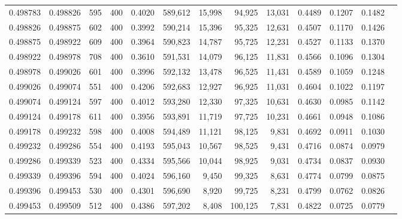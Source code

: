 \begin{tabular}{rrrrrrrrrrrrr}
0.498783 & 0.498826 &    595 & 400 &                                     0.4020 & 589,612 &  15,998 &  94,925 &  13,031 & 0.4489 & 0.1207 & 0.1482 \\
0.498826 & 0.498875 &    602 & 400 &                                     0.3992 & 590,214 &  15,396 &  95,325 &  12,631 & 0.4507 & 0.1170 & 0.1426 \\
0.498875 & 0.498922 &    609 & 400 &                                     0.3964 & 590,823 &  14,787 &  95,725 &  12,231 & 0.4527 & 0.1133 & 0.1370 \\
0.498922 & 0.498978 &    708 & 400 &                                     0.3610 & 591,531 &  14,079 &  96,125 &  11,831 & 0.4566 & 0.1096 & 0.1304 \\
0.498978 & 0.499026 &    601 & 400 &                                     0.3996 & 592,132 &  13,478 &  96,525 &  11,431 & 0.4589 & 0.1059 & 0.1248 \\
0.499026 & 0.499074 &    551 & 400 &                                     0.4206 & 592,683 &  12,927 &  96,925 &  11,031 & 0.4604 & 0.1022 & 0.1197 \\
0.499074 & 0.499124 &    597 & 400 &                                     0.4012 & 593,280 &  12,330 &  97,325 &  10,631 & 0.4630 & 0.0985 & 0.1142 \\
0.499124 & 0.499178 &    611 & 400 &                                     0.3956 & 593,891 &  11,719 &  97,725 &  10,231 & 0.4661 & 0.0948 & 0.1086 \\
0.499178 & 0.499232 &    598 & 400 &                                     0.4008 & 594,489 &  11,121 &  98,125 &   9,831 & 0.4692 & 0.0911 & 0.1030 \\
0.499232 & 0.499286 &    554 & 400 &                                     0.4193 & 595,043 &  10,567 &  98,525 &   9,431 & 0.4716 & 0.0874 & 0.0979 \\
0.499286 & 0.499339 &    523 & 400 &                                     0.4334 & 595,566 &  10,044 &  98,925 &   9,031 & 0.4734 & 0.0837 & 0.0930 \\
0.499339 & 0.499396 &    594 & 400 &                                     0.4024 & 596,160 &   9,450 &  99,325 &   8,631 & 0.4774 & 0.0799 & 0.0875 \\
0.499396 & 0.499453 &    530 & 400 &                                     0.4301 & 596,690 &   8,920 &  99,725 &   8,231 & 0.4799 & 0.0762 & 0.0826 \\
0.499453 & 0.499509 &    512 & 400 &                                     0.4386 & 597,202 &   8,408 & 100,125 &   7,831 & 0.4822 & 0.0725 & 0.0779 \\

\end{tabular}
